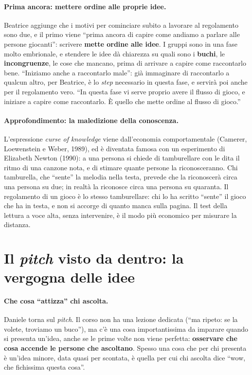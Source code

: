 \paragraph{Prima ancora: mettere ordine alle proprie idee.} Beatrice aggiunge che i
motivi per cominciare subito a lavorare al regolamento sono due, e il primo viene
``prima ancora di capire come andiamo a parlare alle persone giocanti'': scrivere
\textbf{mette ordine alle idee}. I gruppi sono in una fase molto embrionale, e stendere
le idee dà chiarezza su quali sono i \textbf{buchi}, le \textbf{incongruenze}, le cose che
mancano, prima di arrivare a capire come raccontarlo bene. ``Iniziamo anche a raccontarlo
male'': già immaginare di raccontarlo a qualcun altro, per Beatrice, è lo \emph{step}
necessario in questa fase, e servirà poi anche per il regolamento vero. ``In questa fase
vi serve proprio avere il flusso di gioco, e iniziare a capire come raccontarlo. È quello
che mette ordine al flusso di gioco.''

\paragraph{Approfondimento: la maledizione della conoscenza.} L'espressione \emph{curse of
knowledge} viene dall'economia comportamentale (Camerer, Loewenstein e Weber, 1989), ed è
diventata famosa con un esperimento di Elizabeth Newton (1990): a una persona si chiede
di tamburellare con le dita il ritmo di una canzone nota, e di stimare quante persone la
riconosceranno. Chi tamburella, che ``sente'' la melodia nella testa, prevede che la
riconoscerà circa una persona su due; in realtà la riconosce circa una persona su
quaranta. Il regolamento di un gioco è lo stesso tamburellare: chi lo ha scritto ``sente''
il gioco che ha in testa, e non si accorge di quanto manca sulla pagina. Il test della
lettura a voce alta, senza intervenire, è il modo più economico per misurare la
distanza.

\section{Il \emph{pitch} visto da dentro: la vergogna delle idee}
\label{a11:sec:vergogna}

\paragraph{Che cosa ``attizza'' chi ascolta.} Daniele torna sul \emph{pitch}. Il corso non
ha una lezione dedicata (``ma ripeto: se la volete, troviamo un buco''), ma c'è una cosa
importantissima da imparare quando si presenta un'idea, anche se le prime volte non viene
perfetta: \textbf{osservare che cosa accende le persone che ascoltano}. Spesso una cosa
che per chi presenta è un'idea minore, data quasi per scontata, è quella per cui chi
ascolta dice ``wow, che fichissima questa cosa''.


